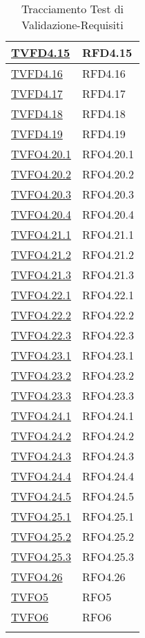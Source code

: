 \begin{longtable}{|>{\centering}m{5cm}|m{5cm}<{\centering}|}
\hyperlink{TVFD4.15}{TVFD4.15} & RFD4.15\\ \hline
\hyperlink{TVFD4.16}{TVFD4.16} & RFD4.16\\ \hline
\hyperlink{TVFD4.17}{TVFD4.17} & RFD4.17\\ \hline
\hyperlink{TVFD4.18}{TVFD4.18} & RFD4.18\\ \hline
\hyperlink{TVFD4.19}{TVFD4.19} & RFD4.19\\ \hline
\hyperlink{TVFO4.20.1}{TVFO4.20.1} & RFO4.20.1\\ \hline
\hyperlink{TVFO4.20.2}{TVFO4.20.2} & RFO4.20.2\\ \hline
\hyperlink{TVFO4.20.3}{TVFO4.20.3} & RFO4.20.3\\ \hline
\hyperlink{TVFO4.20.4}{TVFO4.20.4} & RFO4.20.4\\ \hline
\hyperlink{TVFO4.21.1}{TVFO4.21.1} & RFO4.21.1\\ \hline
\hyperlink{TVFO4.21.2}{TVFO4.21.2} & RFO4.21.2\\ \hline
\hyperlink{TVFO4.21.3}{TVFO4.21.3} & RFO4.21.3\\ \hline
\hyperlink{TVFO4.22.1}{TVFO4.22.1} & RFO4.22.1\\ \hline
\hyperlink{TVFO4.22.2}{TVFO4.22.2} & RFO4.22.2\\ \hline
\hyperlink{TVFO4.22.3}{TVFO4.22.3} & RFO4.22.3\\ \hline
\hyperlink{TVFO4.23.1}{TVFO4.23.1} & RFO4.23.1\\ \hline
\hyperlink{TVFO4.23.2}{TVFO4.23.2} & RFO4.23.2\\ \hline
\hyperlink{TVFO4.23.3}{TVFO4.23.3} & RFO4.23.3\\ \hline
\hyperlink{TVFO4.24.1}{TVFO4.24.1} & RFO4.24.1\\ \hline
\hyperlink{TVFO4.24.2}{TVFO4.24.2} & RFO4.24.2\\ \hline
\hyperlink{TVFO4.24.3}{TVFO4.24.3} & RFO4.24.3\\ \hline
\hyperlink{TVFO4.24.4}{TVFO4.24.4} & RFO4.24.4\\ \hline
\hyperlink{TVFO4.24.5}{TVFO4.24.5} & RFO4.24.5\\ \hline
\hyperlink{TVFO4.25.1}{TVFO4.25.1} & RFO4.25.1\\ \hline
\hyperlink{TVFO4.25.2}{TVFO4.25.2} & RFO4.25.2\\ \hline
\hyperlink{TVFO4.25.3}{TVFO4.25.3} & RFO4.25.3\\ \hline
\hyperlink{TVFO4.26}{TVFO4.26} & RFO4.26\\ \hline
\hyperlink{TVFO5}{TVFO5} & RFO5\\ \hline
\hyperlink{TVFO6}{TVFO6} & RFO6\\ \hline
\caption[Tracciamento Test di Validazione-Requisiti]{Tracciamento Test di Validazione-Requisiti}
\label{tabella:tv-requi}
\end{longtable}
\clearpage

